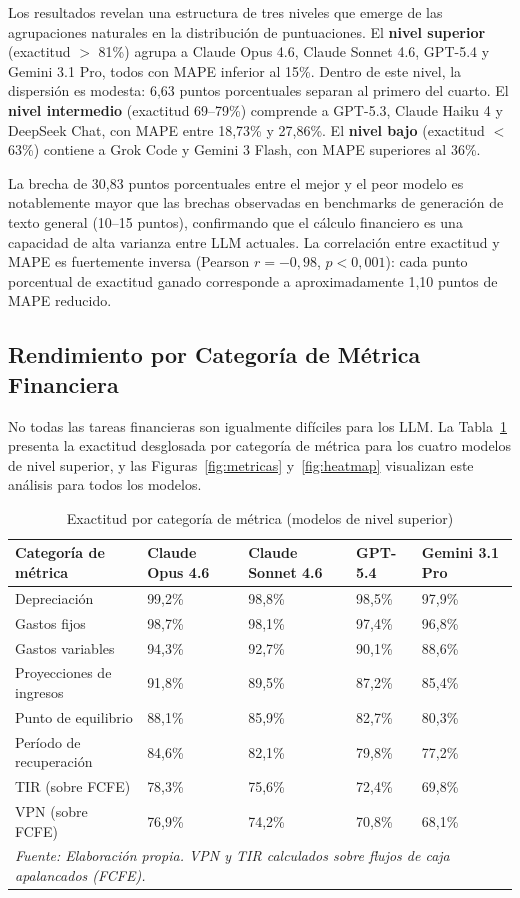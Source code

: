 \documentclass[12pt,a4paper]{article}
\begin{document}
Los resultados revelan una estructura de tres niveles que emerge de las agrupaciones naturales en la distribución de puntuaciones. El \textbf{nivel superior} (exactitud $>$ 81\%) agrupa a Claude Opus 4.6, Claude Sonnet 4.6, GPT-5.4 y Gemini 3.1 Pro, todos con MAPE inferior al 15\%. Dentro de este nivel, la dispersión es modesta: 6,63 puntos porcentuales separan al primero del cuarto. El \textbf{nivel intermedio} (exactitud 69--79\%) comprende a GPT-5.3, Claude Haiku 4 y DeepSeek Chat, con MAPE entre 18,73\% y 27,86\%. El \textbf{nivel bajo} (exactitud $<$ 63\%) contiene a Grok Code y Gemini 3 Flash, con MAPE superiores al 36\%.

La brecha de 30,83 puntos porcentuales entre el mejor y el peor modelo es notablemente mayor que las brechas observadas en benchmarks de generación de texto general (10--15 puntos), confirmando que el cálculo financiero es una capacidad de alta varianza entre LLM actuales. La correlación entre exactitud y MAPE es fuertemente inversa (Pearson $r = -0{,}98$, $p < 0{,}001$): cada punto porcentual de exactitud ganado corresponde a aproximadamente 1,10 puntos de MAPE reducido.

\subsection{Rendimiento por Categoría de Métrica Financiera}

No todas las tareas financieras son igualmente difíciles para los LLM. La Tabla~\ref{tab:metricas} presenta la exactitud desglosada por categoría de métrica para los cuatro modelos de nivel superior, y las Figuras~\ref{fig:metricas} y~\ref{fig:heatmap} visualizan este análisis para todos los modelos.

\begin{table}[ht]
\centering
\caption{Exactitud por categoría de métrica (modelos de nivel superior)}
\label{tab:metricas}
\begin{tabularx}{\linewidth}{lXXXX}
\toprule
\textbf{Categoría de métrica} & \textbf{Claude Opus 4.6} & \textbf{Claude Sonnet 4.6} & \textbf{GPT-5.4} & \textbf{Gemini 3.1 Pro} \\
\midrule
Depreciación             & 99,2\% & 98,8\% & 98,5\% & 97,9\% \\
Gastos fijos             & 98,7\% & 98,1\% & 97,4\% & 96,8\% \\
Gastos variables         & 94,3\% & 92,7\% & 90,1\% & 88,6\% \\
Proyecciones de ingresos & 91,8\% & 89,5\% & 87,2\% & 85,4\% \\
Punto de equilibrio      & 88,1\% & 85,9\% & 82,7\% & 80,3\% \\
Período de recuperación  & 84,6\% & 82,1\% & 79,8\% & 77,2\% \\
TIR (sobre FCFE)         & 78,3\% & 75,6\% & 72,4\% & 69,8\% \\
VPN (sobre FCFE)         & 76,9\% & 74,2\% & 70,8\% & 68,1\% \\
\bottomrule
\multicolumn{5}{l}{\footnotesize\textit{Fuente: Elaboración propia. VPN y TIR calculados sobre flujos de caja apalancados (FCFE).}}
\end{tabularx}
\end{table}
\end{document}
